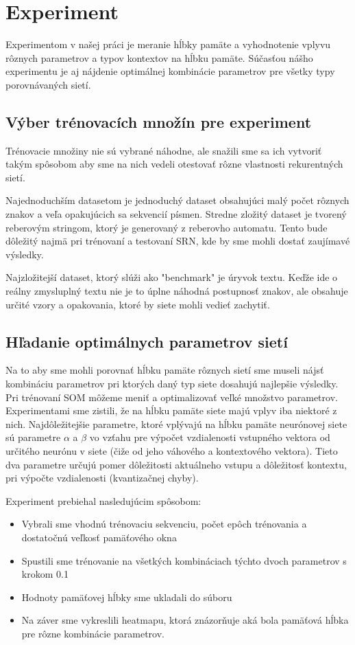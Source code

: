 
\chapter{Experiment}
Experimentom v našej práci je meranie hĺbky pamäte a vyhodnotenie vplyvu rôznych
parametrov a typov kontextov na hĺbku pamäte. Súčasťou nášho experimentu je aj nájdenie 
optimálnej kombinácie parametrov pre všetky typy porovnávaných sietí.

\section{Výber trénovacích množín pre experiment}
Trénovacie množiny nie sú vybrané náhodne, ale snažili sme sa ich vytvoriť
takým spôsobom aby sme na nich vedeli otestovať rôzne vlastnosti rekurentných sietí.

Najednoduchším datasetom je jednoduchý dataset obsahujúci malý počet rôznych znakov a veľa
opakujúcich sa sekvencií písmen.
Stredne zložitý dataset je tvorený reberovým stringom, ktorý je generovaný z reberovho automatu.
Tento bude dôležitý najmä pri trénovaní a testovaní SRN, kde by sme mohli dostať zaujímavé výsledky.


Najzložitejší dataset, ktorý slúži ako "benchmark" je úryvok textu. Keďže ide o reálny zmysluplný textu
nie je to úplne náhodná postupnosť znakov, ale obsahuje určité vzory a opakovania, ktoré by siete mohli vedieť zachytiť.


\section{Hľadanie optimálnych parametrov sietí}
Na to aby sme mohli porovnať hĺbku pamäte rôznych sietí sme museli nájsť kombináciu parametrov
pri ktorých daný typ siete dosahujú najlepšie výsledky. 
Pri trénovaní SOM môžeme meniť a optimalizovať veľké množstvo parametrov. 
Experimentami sme zistili, že na hĺbku pamäte siete majú vplyv iba niektoré z nich. 
Najdôležitejšie parametre, ktoré vplývajú na hĺbku pamäte neurónovej siete sú parametre $\alpha$ a $\beta$
vo vzťahu pre výpočet vzdialenosti vstupného vektora od určitého neurónu v siete (čiže od jeho váhového a kontextového vektora).
Tieto dva parametre určujú pomer dôležitosti aktuálneho vstupu a dôležitosť kontextu, pri výpočte vzdialenosti (kvantizačnej chyby).

Experiment prebiehal nasledujúcim spôsobom:
\begin{itemize}
    \item Vybrali sme vhodnú trénovaciu sekvenciu, počet epôch trénovania a dostatočnú veľkosť pamäťového okna
    \item Spustili sme trénovanie na všetkých kombináciach týchto dvoch parametrov s krokom 0.1
    \item Hodnoty pamäťovej hĺbky sme ukladali do súboru
    \item Na záver sme vykreslili heatmapu, ktorá znázorňuje aká bola pamäťová hĺbka pre rôzne kombinácie parametrov.
\end{itemize}

